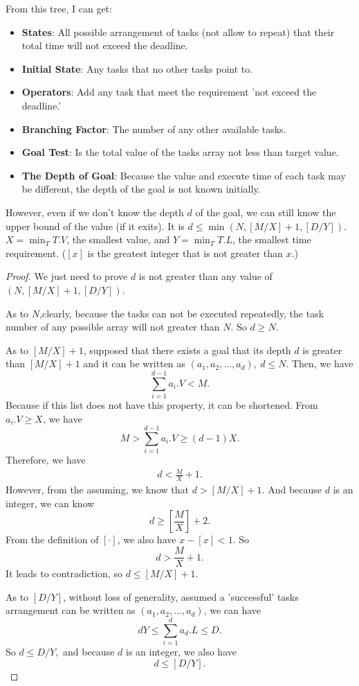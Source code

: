 \documentclass[11pt]{article}
\begin{document}
From this tree, I can get:
\begin{itemize}
	\item \textbf{States}: All possible arrangement of tasks (not allow to repeat) that their total time will not exceed the deadline.
	\item \textbf{Initial State}: Any tasks that no other tasks point to.
	\item \textbf{Operators}: Add any task that meet the requirement 'not exceed the deadline.'
	\item \textbf{Branching Factor}: The number of any other available tasks.
	\item \textbf{Goal Test}: Is the total value of the tasks array not less than target value.
	\item \textbf{The Depth of Goal}: Because the value and execute time of each task may be different, the depth of the goal is not known initially.
\end{itemize}

However, even if we don't know the depth $ d $ of the goal, we can still know the upper bound of the value (if it exits). It is $ d\leq \min(N,[M/X] + 1,[D/Y]) $. $ X = \min_{T}T.V $, the smallest value, and $ Y = \min_{T}T.L $, the smallest time requirement. ($ [x] $ is the greatest integer that is not greater than $ x $.)
\begin{proof}
	We just need to prove  $ d $ is not greater than any value of $ (N,[M/X] + 1,[D/Y]) $.
	
	As to $ N $,clearly, because the tasks can not be executed repeatedly, the task number of any possible array will not greater than $ N $. So $ d\geq N $.
	
	As to $ [M/X] + 1 $, supposed that there exists a goal that its depth $ d $ is greater than $ [M/X] + 1 $ and it can be written as $ (a_1,a_2,\dots,a_d),~d\leq N $. Then, we have $$ \sum_{i=1}^{d-1}a_i.V<M. $$ Because if this list does not have this property, it can be shortened. From $ a_i.V\geq X $, we have $$ M>\sum_{i=1}^{d-1}a_i.V\geq (d-1)X. $$ Therefore, we have 
	\begin{align*}
		d< \frac{M}{X} + 1.
	\end{align*}
	However, from the assuming, we know that $ d>[M/X] + 1 $. And because $ d $ is an integer, we can know $$ d\geq \left[\frac{M}{X}\right] + 2. $$ From the definition of $ [\cdot] $, we also have $ x - [x] < 1 $. So $$ d>\frac{M}{X} + 1. $$It leads to contradiction, so $ d\leq [M/X] + 1 $.
	
	As to $ [D/Y] $, without loss of generality, assumed a 'successful' tasks arrangement can be written as $ (a_1,a_2,\dots,a_d) $, we can have $$ dY\leq\sum_{i=1}^{d}a_d.L\leq D. $$ So $ d\leq D/Y, $ and because $ d $ is an integer, we also have $$ d\leq [D/Y]. $$
\end{proof}
\end{document}
